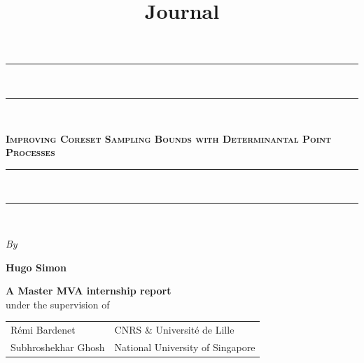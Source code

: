 \documentclass{report} %
\newcommand{\1}{\mathds{1}} %
\theoremstyle{definition}
\theoremstyle{definition} %
\begin{document}
    \title{Journal}

\begin{titlepage}
    \begin{center}
        \vspace*{25pt} {
        \begin{spacing}{0.05}
            \rule{400pt}{2pt}\\
            \rule{400pt}{0.75pt}\\
        \end{spacing}
        \vspace{20pt}
        \begin{spacing}{0.9}
            \fontsize{26pt}{26pt}\selectfont%
            \textsc{\textbf{Improving Coreset Sampling Bounds with Determinantal Point Processes}}\\%
        \end{spacing}
        \vspace{5pt}
        \begin{spacing}{0.05}
            \rule{400pt}{0.75pt}\\
            \rule{400pt}{2pt}\\
        \end{spacing}
        }
    
        \vspace*{1cm}
        \begin{large}
        \textit{By}\\%
        \end{large}
    
    
        \vspace*{4pt}
        \begin{Large}
        \textbf{Hugo Simon}\\%
        \end{Large}
    
    \begin{large}
        \vspace*{5cm}
        \textbf{
        A Master MVA internship report }
        \vspace*{6pt}\\
        under the supervision of
        \vspace*{20pt}\\
    
        \begin{longtable*}{ p{0.4\textwidth} p{0.5\textwidth} }
            R\'emi Bardenet & CNRS \& Université de Lille
            \tabularnewline Subhroshekhar Ghosh & National University of Singapore
            \tabularnewline
        \end{longtable*}
    \end{large}
    

\end{center}
\end{titlepage}
\end{document}

